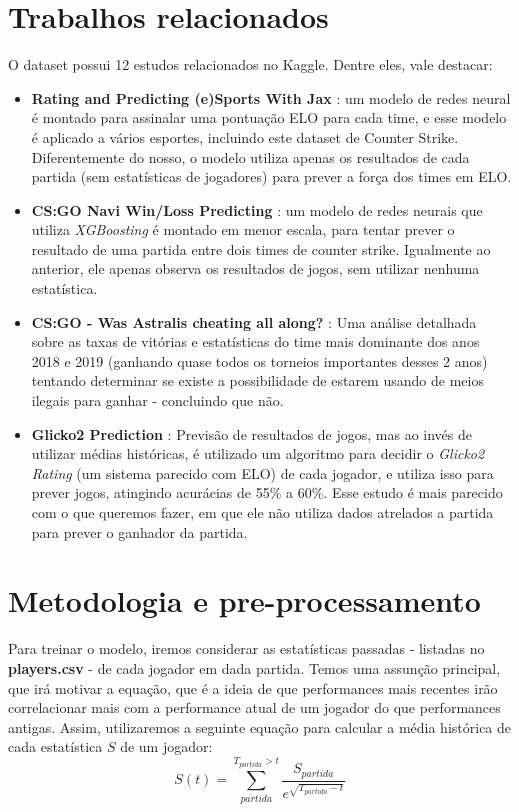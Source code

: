 \documentclass[12pt]{article}
\begin{document}
\section{Trabalhos relacionados}

O dataset possui 12 estudos relacionados no Kaggle. Dentre eles, vale destacar:
\begin{itemize}
\item \textbf{Rating and Predicting (e)Sports With Jax} \cite{jaxElo}: um modelo de redes neural é montado para assinalar uma pontuação ELO para cada time, e esse modelo é aplicado a vários esportes, incluindo este dataset de Counter Strike. Diferentemente do nosso, o modelo utiliza apenas os resultados de cada partida (sem estatísticas de jogadores) para prever a força dos times em ELO.
\item \textbf{CS:GO Navi Win/Loss Predicting} \cite{navi}: um modelo de redes neurais que utiliza \textit{XGBoosting} é montado em menor escala, para tentar prever o resultado de uma partida entre dois times de counter strike. Igualmente ao anterior, ele apenas observa os resultados de jogos, sem utilizar nenhuma estatística. \url{}
\item \textbf{CS:GO - Was Astralis cheating all along?} \cite{astralis}: Uma análise detalhada sobre as taxas de vitórias e estatísticas do time mais dominante dos anos 2018 e 2019 (ganhando quase todos os torneios importantes desses 2 anos) tentando determinar se existe a possibilidade de estarem usando de meios ilegais para ganhar - concluindo que não.
\item \textbf{Glicko2 Prediction} \cite{glicko2}: Previsão de resultados de jogos, mas ao invés de utilizar médias históricas, é utilizado um algoritmo para decidir o \textit{Glicko2 Rating} (um sistema parecido com ELO) de cada jogador, e utiliza isso para prever jogos, atingindo acurácias de 55\% a 60\%. Esse estudo é mais parecido com o que queremos fazer, em que ele não utiliza dados atrelados a partida para prever o ganhador da partida.
\end{itemize}

\section{Metodologia e pre-processamento}

Para treinar o modelo, iremos considerar as estatísticas passadas - listadas no \textbf{players.csv} - de cada jogador em dada partida. Temos uma assunção principal, que irá motivar a equação, que é a ideia de que performances mais recentes irão correlacionar mais com a performance atual de um jogador do que performances antigas. Assim, utilizaremos a seguinte equação para calcular a média histórica de cada estatística $S$ de um jogador:
\begin{equation}
  S(t) = \sum_{partida}^{T_{partida} > t} \frac{ S_{partida}}{e^{\sqrt{T_{partida} - t}}}
\end{equation}
\end{document}
